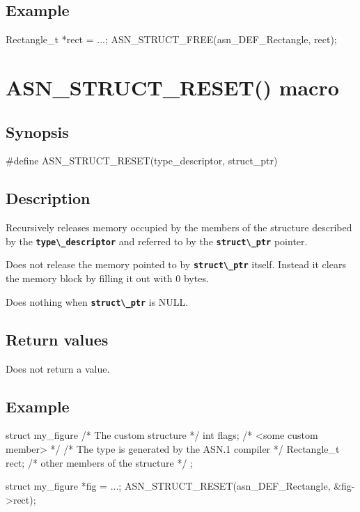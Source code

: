 \documentclass[english,oneside,12pt]{book}
\newcommand{\apisection}[2]{\clearpage\section{\label{#1}#2}}
\newcommand{\code}[1]{\texttt{\textbf{\lstinline{#1}}}}
\begin{document}
\subsection*{Example}

\begin{example}
Rectangle_t *rect = ...;
ASN_STRUCT_FREE(asn_DEF_Rectangle, rect);
\end{example}

\apisection{sec:ASN_STRUCT_RESET}{ASN\_STRUCT\_RESET() macro}

\subsection*{Synopsis}

\begin{signature}
#define ASN_STRUCT_RESET(type_descriptor, struct_ptr)
\end{signature}

\subsection*{Description}

Recursively releases memory occupied by the members of the structure
described by the \code{type\_descriptor} and referred to
by the \code{struct\_ptr} pointer.

Does not release the memory pointed to by \code{struct\_ptr} itself.
Instead it clears the memory block by filling it out with 0 bytes.

Does nothing when \code{struct\_ptr} is NULL.

\subsection*{Return values}
Does not return a value.

\subsection*{Example}

\begin{example}
struct my_figure {       /* The custom structure */
    int flags;           /* <some custom member> */
    /* The type is generated by the ASN.1 compiler */
    Rectangle_t rect;
    /* other members of the structure */
};

struct my_figure *fig = ...;
ASN_STRUCT_RESET(asn_DEF_Rectangle, &fig->rect);
\end{example}
\end{document}
